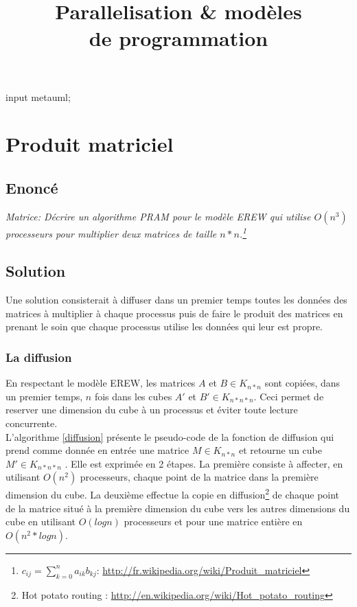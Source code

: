 \documentclass[oneside,11pt]{article}
\title{Parallelisation \& modèles\\de programmation}
\begin{document}
\begin{empfile}

\begin{empcmds}
input metauml;
\end{empcmds}

\maketitle

\tableofcontents

\newpage

\section{Produit matriciel}

\subsection{Enoncé}
\textit{Matrice: Décrire un algorithme PRAM pour le modèle EREW qui utilise $O(n^3)$ processeurs pour multiplier deux matrices de taille $n*n$.\footnote{$c_{ij} = \sum_{k=0}^n a_{ik} b_{kj}$: \url{http://fr.wikipedia.org/wiki/Produit_matriciel}}}

\subsection{Solution}
Une solution consisterait à diffuser dans un premier temps toutes les données des matrices à multiplier à chaque processus puis de faire le produit des matrices en prenant le soin que chaque processus utilise les données qui leur est propre.

\subsubsection{La diffusion}
En respectant le modèle EREW, les matrices $A$ et $B \in K_{n*n}$ sont copiées, dans un premier temps, $n$ fois dans les cubes $A'$ et $B' \in K_{n*n*n}$. Ceci permet de reserver une dimension du cube à un processus et éviter toute lecture concurrente.\\

L'algorithme \ref{diffusion} présente le pseudo-code de la fonction de diffusion qui prend comme donnée en entrée une matrice $M \in K_{n*n}$ et retourne un cube $M' \in K_{n*n*n}$ . Elle est exprimée en 2 étapes. La première consiste à affecter, en utilisant $O(n^2)$ processeurs, chaque point de la matrice dans la première dimension du cube. La deuxième effectue la copie en diffusion\footnote{Hot potato routing : \url{http://en.wikipedia.org/wiki/Hot_potato_routing}} de chaque point de la matrice situé à la première dimension du cube vers les autres dimensions du cube en utilisant $O(log n)$ processeurs et pour une matrice entière en $O(n^2 * log n)$.


\end{empfile}
\end{document}
